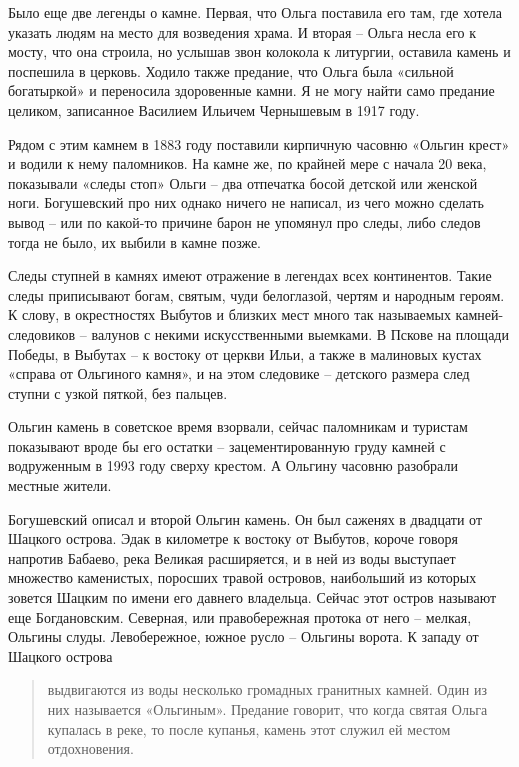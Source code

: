 Было еще две легенды о камне. Первая, что Ольга поставила его там, где хотела указать людям на место для возведения храма. И вторая – Ольга несла его к мосту, что она строила, но услышав звон колокола к литургии, оставила камень и поспешила в церковь. Ходило также предание, что Ольга была «сильной богатыркой» и переносила здоровенные камни. Я не могу найти само предание целиком, записанное Василием Ильичем Чернышевым в 1917 году.

Рядом с этим камнем в 1883 году поставили кирпичную часовню «Ольгин крест» и водили к нему паломников. На камне же, по крайней мере с начала 20 века, показывали «следы стоп» Ольги – два отпечатка босой детской или женской ноги. Богушевский про них однако ничего не написал, из чего можно сделать вывод – или по какой-то причине барон не упомянул про следы, либо следов тогда не было, их выбили в камне позже. 

Следы ступней в камнях имеют отражение в легендах всех континентов. Такие следы приписывают богам, святым, чуди белоглазой, чертям и народным героям. К слову, в окрестностях Выбутов и близких мест много так называемых камней-следовиков – валунов с некими искусственными выемками. В Пскове на площади Победы, в Выбутах – к востоку от церкви Ильи, а также в малиновых кустах «справа от Ольгиного камня», и на этом следовике – детского размера след ступни с узкой пяткой, без пальцев.

Ольгин камень в советское время взорвали, сейчас паломникам и туристам показывают вроде бы его остатки – зацементированную груду камней с водруженным в 1993 году сверху крестом. А Ольгину часовню разобрали местные жители.

Богушевский описал и второй Ольгин камень. Он был саженях в двадцати от Шацкого острова. Эдак в километре к востоку от Выбутов, короче говоря напротив Бабаево, река Великая расширяется, и в ней из воды выступает множество каменистых, поросших травой островов, наибольший из которых зовется Шацким по имени его давнего владельца. Сейчас этот остров называют еще Богдановским. Северная, или правобережная протока от него – мелкая, Ольгины слуды. Левобережное, южное русло – Ольгины ворота. К западу от Шацкого острова

\begin{quotation} 
выдвигаются из воды несколько громадных гранитных камней. Один из них называется «Ольгиным». Предание говорит, что когда святая Ольга купалась в реке, то после купанья, камень этот служил ей местом отдохновения.
\end{quotation} 

